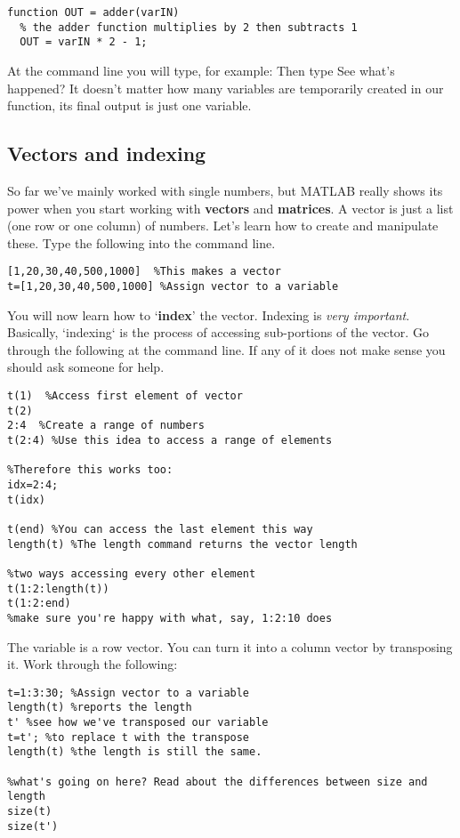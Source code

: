 \documentclass{article}
\begin{document}
\begin{lstlisting}
function OUT = adder(varIN)
  % the adder function multiplies by 2 then subtracts 1
  OUT = varIN * 2 - 1;

\end{lstlisting}

At the command line you will type, for example:  Then type  See what's happened? It doesn't matter how many variables are temporarily created in our function, its final output is just one variable.



\pagebreak
\subsection*{Vectors and indexing}
So far we've mainly worked with single numbers, but MATLAB really shows its power when you start working with \textbf{vectors} and 
\textbf{matrices}. A vector is just a list (one row or one column) of numbers. Let's learn how to create and manipulate these. Type
the following into the command line.

\begin{lstlisting}
[1,20,30,40,500,1000]  %This makes a vector
t=[1,20,30,40,500,1000] %Assign vector to a variable
\end{lstlisting}

You will now learn how to `\textbf{index}' the vector. Indexing is \textit{very important}. Basically, `indexing`
is the process of accessing sub-portions of the vector. Go through the following at the command line. If any of it
does not make sense you should ask someone for help. 
\begin{lstlisting}
t(1)  %Access first element of vector
t(2)
2:4  %Create a range of numbers
t(2:4) %Use this idea to access a range of elements

%Therefore this works too:
idx=2:4;
t(idx)

t(end) %You can access the last element this way
length(t) %The length command returns the vector length

%two ways accessing every other element
t(1:2:length(t))
t(1:2:end)
%make sure you're happy with what, say, 1:2:10 does
\end{lstlisting}

The variable  is a row vector. You can turn it into a column vector by transposing it. Work through the following:

\begin{lstlisting}
t=1:3:30; %Assign vector to a variable
length(t) %reports the length
t' %see how we've transposed our variable
t=t'; %to replace t with the transpose
length(t) %the length is still the same. 

%what's going on here? Read about the differences between size and length
size(t)
size(t')

\end{lstlisting}
\end{document}
